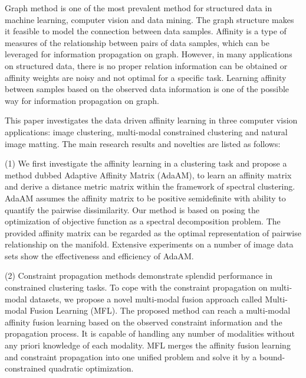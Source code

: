\begin{abstract}
\end{abstract}

\begin{enabstract}
  Graph method is one of the most prevalent method for structured data in machine learning, computer vision and data mining. The graph structure makes it feasible to model the connection between data samples. Affinity is a type of measures of the relationship between pairs of data samples, which can be leveraged for information propagation on graph. However, in many applications on structured data, there is no proper relation information can be obtained or affinity weights are noisy and not optimal for a specific task. Learning affinity between samples based on the observed data information is one of the possible way for information propagation on graph.

  This paper investigates the data driven affinity learning in three computer vision applications: image clustering, multi-modal constrained clustering and natural image matting. The main research results and novelties are listed as follows:

  (1) We first investigate the affinity learning in a clustering task and propose a method dubbed Adaptive Affinity Matrix (AdaAM), to learn an affinity matrix and derive a distance metric matrix within the framework of spectral clustering. AdaAM assumes the affinity matrix to be positive semidefinite with ability to quantify the pairwise dissimilarity. Our method is based on posing the optimization of objective function as a spectral decomposition problem. The provided affinity matrix can be regarded as the optimal representation of pairwise relationship on the manifold. Extensive experiments on a number of image data sets show the effectiveness and efficiency of AdaAM.

  (2) Constraint propagation methods demonstrate splendid performance in constrained clustering tasks. To cope with the constraint propagation on multi-modal datasets, we propose a novel multi-modal fusion approach  called Multi-modal Fusion Learning (MFL). The proposed method can reach a multi-modal affinity fusion learning based on the observed constraint information and the propagation process. It is capable of handling any number of modalities without any priori knowledge of each modality. MFL merges the affinity fusion learning and constraint propagation into one unified problem and solve it by a bound-constrained quadratic optimization.


\end{enabstract}

